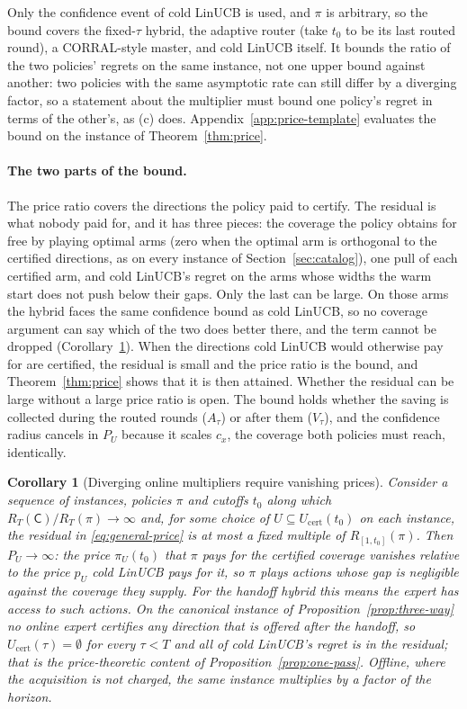 \documentclass{article}
\newtheorem{corollary}{Corollary}
\theoremstyle{definition}
\theoremstyle{remark}
\theoremstyle{remark}
\newcommand{\Cold}{\mathsf{C}}
\begin{document}
Only the confidence event of cold LinUCB is used, and
$\pi$ is arbitrary, so the bound covers the fixed-$\tau$ hybrid, the adaptive
router (take $t_0$ to be its last routed round), a CORRAL-style master, and
cold LinUCB itself. It bounds the ratio of the two policies' regrets on the
same instance, not one upper bound against another: two policies with the
same asymptotic rate can still differ by a diverging factor, so a statement
about the multiplier must bound one policy's regret in terms of the other's,
as (c) does. Appendix~\ref{app:price-template} evaluates the bound on the
instance of Theorem~\ref{thm:price}.

\paragraph{The two parts of the bound.}
The price ratio covers the directions the policy paid to certify. The
residual is what nobody paid for, and it has three pieces: the coverage the policy obtains for free by playing optimal arms
(zero when the optimal arm is orthogonal to the certified directions, as on
every instance of Section~\ref{sec:catalog}), one pull of each certified arm,
and cold LinUCB's regret on the arms whose widths the warm start does not push
below their gaps. Only the last can be large. On those arms the hybrid faces
the same confidence bound as cold LinUCB, so no coverage argument can say
which of the two does better there, and the term cannot be dropped
(Corollary~\ref{cor:diverge}). When the directions cold LinUCB would
otherwise pay for are certified, the residual is small and the price ratio is
the bound, and Theorem~\ref{thm:price} shows that it is then attained.
Whether the residual can be large without a large price ratio is open. The
bound holds whether the saving is collected during the routed rounds
($A_\tau$) or after them ($V_\tau$), and the confidence radius cancels in
$P_U$ because it scales $c_x$, the coverage both policies must reach,
identically.

\begin{corollary}[Diverging online multipliers require vanishing prices]
\label{cor:diverge}
Consider a sequence of instances, policies $\pi$ and cutoffs $t_0$ along
which $R_T(\Cold)/R_T(\pi)\to\infty$ and, for some choice of
$U\subseteq U_{\mathrm{cert}}(t_0)$ on each instance, the residual in
\eqref{eq:general-price} is at most a fixed multiple of $R_{[1,t_0]}(\pi)$.
Then $P_U\to\infty$: the price $\pi_U(t_0)$ that $\pi$ pays for the certified
coverage vanishes relative to the price $p_U$ cold LinUCB pays for it, so
$\pi$ plays actions whose gap is negligible against the coverage they supply.
For the handoff hybrid this means the expert has access to such actions.
On the canonical instance of Proposition~\ref{prop:three-way} no online expert
certifies any direction that is offered after the handoff, so
$U_{\mathrm{cert}}(\tau)=\emptyset$ for every $\tau<T$ and all of cold LinUCB's
regret is in the residual; that is the price-theoretic content of
Proposition~\ref{prop:one-pass}. Offline, where the acquisition is not
charged, the same instance multiplies by a factor of the horizon.
\end{corollary}
\end{document}
